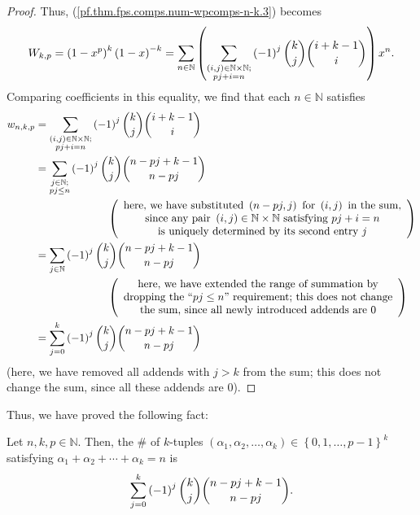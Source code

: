 \begin{proof}
Thus, (\ref{pf.thm.fps.comps.num-wpcomps-n-k.3}) becomes
\[
W_{k,p}=\left(  1-x^{p}\right)  ^{k}\left(  1-x\right)  ^{-k}=\sum
_{n\in\mathbb{N}}\left(  \sum_{\substack{\left(  i,j\right)  \in
\mathbb{N}\times\mathbb{N};\\pj+i=n}}\left(  -1\right)  ^{j}\dbinom{k}%
{j}\dbinom{i+k-1}{i}\right)  x^{n}.
\]
Comparing coefficients in this equality, we find that each $n\in\mathbb{N}$
satisfies%
\begin{align*}
w_{n,k,p}  &  =\sum_{\substack{\left(  i,j\right)  \in\mathbb{N}%
\times\mathbb{N};\\pj+i=n}}\left(  -1\right)  ^{j}\dbinom{k}{j}\dbinom
{i+k-1}{i}\\
&  =\sum_{\substack{j\in\mathbb{N};\\pj\leq n}}\left(  -1\right)  ^{j}%
\dbinom{k}{j}\dbinom{n-pj+k-1}{n-pj}\\
&  \ \ \ \ \ \ \ \ \ \ \ \ \ \ \ \ \ \ \ \ \left(
\begin{array}
[c]{c}%
\text{here, we have substituted }\left(  n-pj,j\right)  \text{ for }\left(
i,j\right)  \text{ in the sum,}\\
\text{since any pair }\left(  i,j\right)  \in\mathbb{N}\times\mathbb{N}\text{
satisfying }pj+i=n\\
\text{is uniquely determined by its second entry }j
\end{array}
\right) \\
&  =\sum_{j\in\mathbb{N}}\left(  -1\right)  ^{j}\dbinom{k}{j}\dbinom
{n-pj+k-1}{n-pj}\\
&  \ \ \ \ \ \ \ \ \ \ \ \ \ \ \ \ \ \ \ \ \left(
\begin{array}
[c]{c}%
\text{here, we have extended the range of summation by}\\
\text{dropping the \textquotedblleft}pj\leq n\text{\textquotedblright%
\ requirement; this does not change}\\
\text{the sum, since all newly introduced addends are }0
\end{array}
\right) \\
&  =\sum_{j=0}^{k}\left(  -1\right)  ^{j}\dbinom{k}{j}\dbinom{n-pj+k-1}{n-pj}%
\end{align*}
(here, we have removed all addends with $j>k$ from the sum; this does not
change the sum, since all these addends are $0$).
\end{proof}

Thus, we have proved the following fact:

\begin{theorem}
\label{thm.fps.comps.num-wpcomps-n-k}Let $n,k,p\in\mathbb{N}$. Then, the \# of
$k$-tuples $\left(  \alpha_{1},\alpha_{2},\ldots,\alpha_{k}\right)
\in\left\{  0,1,\ldots,p-1\right\}  ^{k}$ satisfying $\alpha_{1}+\alpha
_{2}+\cdots+\alpha_{k}=n$ is%
\[
\sum_{j=0}^{k}\left(  -1\right)  ^{j}\dbinom{k}{j}\dbinom{n-pj+k-1}{n-pj}.
\]

\end{theorem}

